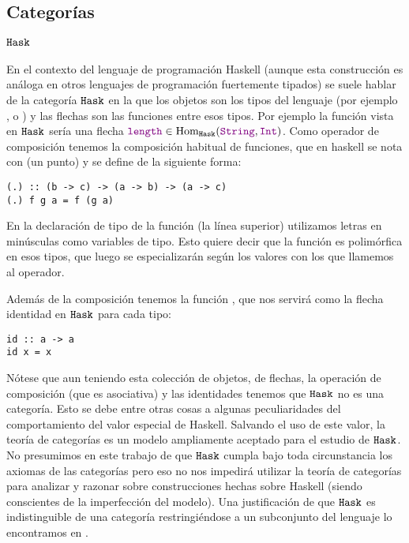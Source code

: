 \subsection{Categorías}
\paragraph{$\texttt{Hask}$}
En el contexto del lenguaje de programación Haskell (aunque esta
construcción es análoga en otros lenguajes de programación
fuertemente tipados) se suele hablar de la categoría
$\texttt{Hask}$  en la que los objetos son los tipos del lenguaje
(por ejemplo ,  o ) y
las flechas son las funciones entre esos tipos. Por ejemplo
la función  vista en
$\texttt{Hask}$ sería una flecha
$\textcolor{violet}{\texttt{length}} \in \operatorname{Hom}_{\texttt{Hask}}(\textcolor{violet}{\texttt{String}}, \textcolor{violet}{\texttt{Int}})$.
Como operador de composición tenemos la composición habitual de
funciones, que en haskell se nota con  (un punto) y se
define de la siguiente forma:
\begin{verbatim}
(.) :: (b -> c) -> (a -> b) -> (a -> c)
(.) f g a = f (g a)
\end{verbatim}
En la declaración de tipo de la función  (la línea superior)
utilizamos letras en minúsculas como variables de tipo. Esto quiere
decir que la función es polimórfica en esos tipos, que luego se
especializarán según los valores con los que llamemos al operador.

Además de la composición tenemos la función ,
que nos servirá como la flecha identidad en $\texttt{Hask}$ para
cada tipo:
\begin{verbatim}
id :: a -> a
id x = x
\end{verbatim}
Nótese que aun teniendo esta colección de objetos, de flechas, la
operación de composición (que es asociativa) y las identidades tenemos
que $\texttt{Hask}$ no es una categoría. Esto se debe
entre otras cosas a algunas
peculiaridades del comportamiento del
valor especial  de Haskell. Salvando el uso de
este valor, la teoría de categorías es un modelo ampliamente aceptado
para el estudio de $\texttt{Hask}$. No presumimos en este trabajo
de que $\texttt{Hask}$ cumpla bajo toda circunstancia los axiomas de las
categorías pero eso no nos impedirá utilizar la teoría de categorías
para analizar y razonar sobre construcciones hechas sobre Haskell
(siendo conscientes de la imperfección del modelo).
Una justificación de que $\texttt{Hask}$ es indistinguible de una
categoría restringiéndose a un subconjunto del lenguaje lo encontramos
en \cite{fastandloose}.

